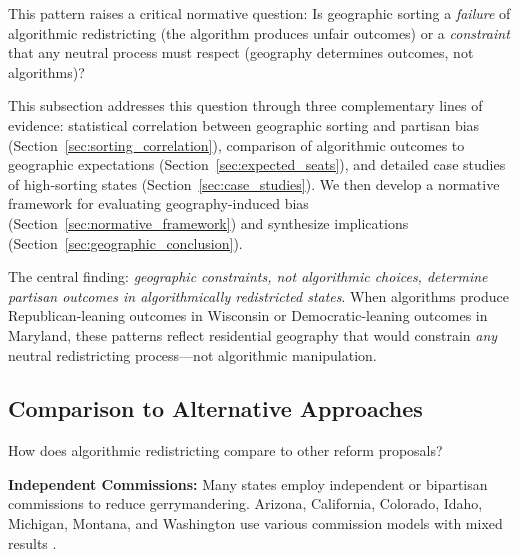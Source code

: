 This pattern raises a critical normative question: Is geographic sorting a \textit{failure} of algorithmic redistricting (the algorithm produces unfair outcomes) or a \textit{constraint} that any neutral process must respect (geography determines outcomes, not algorithms)?

This subsection addresses this question through three complementary lines of evidence: statistical correlation between geographic sorting and partisan bias (Section~\ref{sec:sorting_correlation}), comparison of algorithmic outcomes to geographic expectations (Section~\ref{sec:expected_seats}), and detailed case studies of high-sorting states (Section~\ref{sec:case_studies}). We then develop a normative framework for evaluating geography-induced bias (Section~\ref{sec:normative_framework}) and synthesize implications (Section~\ref{sec:geographic_conclusion}).

The central finding: \textit{geographic constraints, not algorithmic choices, determine partisan outcomes in algorithmically redistricted states}. When algorithms produce Republican-leaning outcomes in Wisconsin or Democratic-leaning outcomes in Maryland, these patterns reflect residential geography that would constrain \textit{any} neutral redistricting process---not algorithmic manipulation.











\subsection{Comparison to Alternative Approaches}

How does algorithmic redistricting compare to other reform proposals?

\textbf{Independent Commissions:} Many states employ independent or bipartisan commissions to reduce gerrymandering. Arizona, California, Colorado, Idaho, Michigan, Montana, and Washington use various commission models with mixed results \cite{stephanopoulos2015partisan}.

